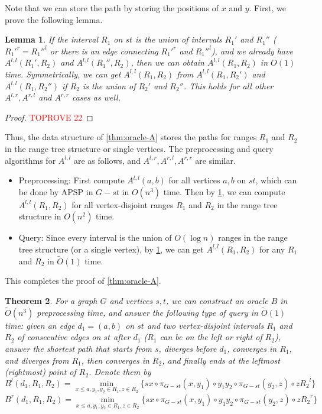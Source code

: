 \documentclass[11pt]{article}
\theoremstyle{plain}
\newtheorem{theorem}{Theorem}[section]
\newtheorem{lemma}[theorem]{Lemma}
\theoremstyle{definition}
\newcommand{\too}[1]{\tilde{O}({#1})}
\newcommand{\zdd}[1]{{#1}^{l}}
\newcommand{\ydd}[1]{{#1}^{r}}
\begin{document}
Note that we can store the path by storing the positions of $x$ and $y$. First, we prove the following lemma.

\begin{lemma}\label{lemma:merging-A}
    If the interval $R_1$ on $st$ is the union of intervals $R_1'$ and $R_1''$ ($\ydd{R_1'}=\zdd{R_1''}$ or there is an edge connecting $\ydd{R_1'}$ and $\zdd{R_1''}$), and we already have $A^{l,l}(R_1',R_2)$ and $A^{l,l}(R_1'',R_2)$, then we can obtain $A^{l,l}(R_1,R_2)$ in $O(1)$ time. Symmetrically, we can get $A^{l,l}(R_1,R_2)$ from $A^{l,l}(R_1,R_2')$ and $A^{l,l}(R_1,R_2'')$ if $R_2$ is the union of $R_2'$ and $R_2''$. This holds for all other $A^{l,r},A^{r,l}$ and $A^{r,r}$ cases as well.
\end{lemma}

\begin{proof}\textcolor{red}{TOPROVE 22}\end{proof}

Thus, the data structure of \cref{thm:oracle-A} stores the paths for ranges $R_1$ and $R_2$ in the range tree structure or single vertices. The preprocessing and query algorithms for $A^{l,l}$ are as follows, and $A^{l,r},A^{r,l},A^{r,r}$ are similar.
\begin{itemize}
    \item Preprocessing: First compute $A^{l,l}(a,b)$ for all vertices $a,b$ on $st$, which can be done by APSP in $G-st$ in $O(n^3)$ time. Then by \cref{lemma:merging-A}, we can compute $A^{l,l}(R_1,R_2)$ for all vertex-disjoint ranges $R_1$ and $R_2$ in the range tree structure in $O(n^2)$ time.
    \item Query: Since every interval is the union of $O(\log n)$ ranges in the range tree structure (or a single vertex), by \cref{lemma:merging-A}, we can get $A^{l,l}(R_1,R_2)$ for any $R_1$ and $R_2$ in $\too{1}$ time.
\end{itemize}

This completes the proof of \cref{thm:oracle-A}.



\begin{theorem}\label{thm:oracle-B}
   For a graph $G$ and vertices $s,t$, we can construct an oracle $B$ in $\too{n^3}$ preprocessing time, and answer the following type of query in $\too{1}$ time: given an edge $d_1=(a,b)$ on $st$ and two vertex-disjoint intervals $R_1$ and $R_2$ of consecutive edges on $st$ after $d_1$ ($R_1$ can be on the left or right of $R_2$), answer the shortest path that starts from $s$, diverges before $d_1$, converges in $R_1$, and diverges from $R_1$, then converges in $R_2$, and finally ends at the leftmost (rightmost) point of $R_2$. Denote them by 
    $$B^l(d_1,R_1,R_2) = \min_{x\leq a, y_1, y_2\in {R_1}, z\in {R_2}} \{sx\circ \pi_{G-st}(x, y_1)\circ y_1y_2\circ \pi_{G-st}(y_2, z)\circ z\zdd{R_2}\}$$ 
    $$B^r(d_1,R_1,R_2) = \min_{x\leq a, y_1, y_2\in {R_1}, z\in {R_2}} \{sx\circ \pi_{G-st}(x, y_1)\circ y_1y_2\circ \pi_{G-st}(y_2, z)\circ z\ydd{R_2}\}$$ 
\end{theorem}
\end{document}
